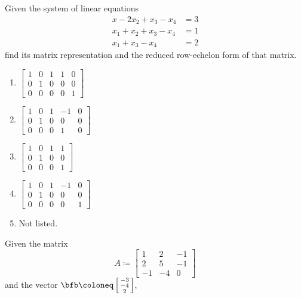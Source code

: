 \begin{questions}
  \question Given the system of linear equations
  \begin{equation}
    \label{eq:2:1}
    \begin{aligned}
      x-2x_2+x_3-x_4&=3\\
      x_1+x_2+x_3-x_4&=1\\
      x_1+x_3-x_4&=2
    \end{aligned}
  \end{equation}
  find its matrix representation and the reduced row-echelon form of that
  matrix.
  \begin{enumerate}[label=\MakeUppercase{\alph*})]
  \item $\left[
    \begin{smallmatrix}
      1&0&1&1&0\\0&1&0&0&0\\0&0&0&0&1
    \end{smallmatrix}
    \right]$
  \item $\left[
    \begin{smallmatrix}
      1&0&1&-1&0\\0&1&0&0&0\\0&0&0&1&0
    \end{smallmatrix}
    \right]$
  \item $\left[
    \begin{smallmatrix}
      1&0&1&1\\0&1&0&0\\0&0&0&1
    \end{smallmatrix}
    \right]$
    \item $\left[
    \begin{smallmatrix}
      1&0&1&-1&0\\0&1&0&0&0\\0&0&0&0&1
    \end{smallmatrix}
    \right]$
  \item Not listed.
  \end{enumerate}
  \question Given the matrix
  \begin{equation}
    \label{eq:2:2}
    A\coloneq
    \begin{bmatrix}
      1&2&-1\\
      2&5&-1\\
      -1&-4&0
    \end{bmatrix}
  \end{equation}
  and the vector
  $\bfb\coloneq\left[\begin{smallmatrix}-3\\-4\\2\end{smallmatrix}\right]$,

\end{questions}
